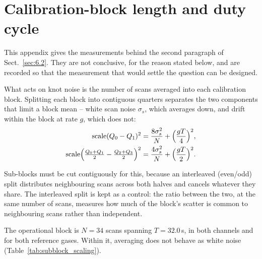 \section{Calibration-block length and duty cycle}
\label{app:C}

This appendix gives the measurements behind the second paragraph of Sect.~\ref{sec:6.2}. They are not conclusive, for the
reason stated below, and are recorded so that the measurement that would settle the question can be designed.

What acts on knot noise is the number of scans averaged into each
calibration block. Splitting each block into contiguous quarters separates the
two components that limit a block mean -- white scan noise $\sigma_s$, which
averages down, and drift within the block at rate $g$, which does not:
\begin{equation}
\begin{split}
\mathrm{scale}(Q_0-Q_1)^2 &= \frac{8\sigma_s^2}{N} + \Bigl(\frac{gT}{4}\Bigr)^2,\\
\mathrm{scale}\Bigl(\tfrac{Q_0+Q_1}{2}-\tfrac{Q_2+Q_3}{2}\Bigr)^2
 &= \frac{4\sigma_s^2}{N} + \Bigl(\frac{gT}{2}\Bigr)^2 .
\end{split}
\label{eq:18}
\end{equation}

Sub-blocks must be cut contiguously for this, because an interleaved
(even/odd) split distributes neighbouring scans across both halves and
cancels whatever they share. The interleaved split is kept as a control: the
ratio between the two, at the same number of scans, measures how much of the
block's scatter is common to neighbouring scans rather than independent.

The operational block is $N = 34$ scans spanning $T = 32.0$\,s, in both
channels and for both reference gases. Within it, averaging does not behave as
white noise (Table~\ref{tab:subblock_scaling}).

